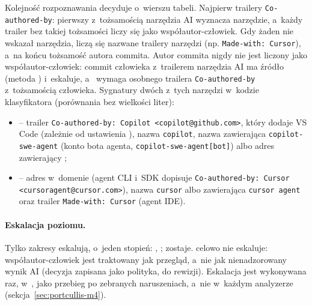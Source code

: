 Kolejność rozpoznawania decyduje o~wierszu tabeli. Najpierw trailery \texttt{Co-authored-by}:
pierwszy z~tożsamością narzędzia AI wyznacza narzędzie, a~każdy trailer bez takiej
tożsamości liczy się jako współautor-człowiek. Gdy żaden nie wskazał narzędzia, liczą się
nazwane trailery narzędzi (np. \texttt{Made-with: Cursor}), a~na końcu tożsamość autora
commita. Autor commita nigdy nie jest liczony jako współautor-człowiek: commit człowieka
z~trailerem narzędzia AI ma źródło  (metoda )
i~eskaluje, a~ wymaga osobnego trailera \texttt{Co-authored-by}
z~tożsamością człowieka. Sygnatury dwóch z~tych narzędzi w~kodzie klasyfikatora (porównania
bez wielkości liter):
\begin{itemize}[leftmargin=*]
  \item {} -- trailer \texttt{Co-authored-by: Copilot <copilot@github.com>},
        który dodaje VS Code (zależnie od ustawienia ), nazwa
        \texttt{copilot}, nazwa zawierająca \texttt{copilot-swe-agent} (konto bota agenta,
        \texttt{copilot-swe-agent[bot]}) albo adres zawierający
        ;
  \item {} -- adres w~domenie  (agent CLI i~SDK dopisuje
        \texttt{Co-authored-by: Cursor <cursoragent@cursor.com>}), nazwa \texttt{cursor} albo
        zawierająca \texttt{cursor agent} oraz trailer \texttt{Made-with: Cursor} (agent IDE).
\end{itemize}

\paragraph{Eskalacja poziomu.} Tylko zakresy  eskalują, o~jeden stopień:
 \textrightarrow{} ,  \textrightarrow{}
;  zostaje.  celowo nie eskaluje:
współautor-człowiek jest traktowany jak przegląd, a~nie jak nienadzorowany wynik AI (decyzja
zapisana jako polityka, do rewizji). Eskalacja jest wykonywana raz, w~,
jako przebieg po zebranych naruszeniach, a~nie w~każdym analyzerze (sekcja~\ref{sec:portcullis-m4}).

